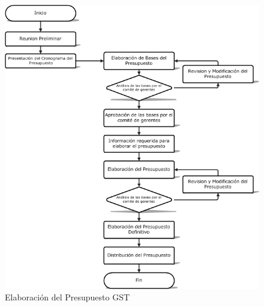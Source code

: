 \documentclass[12pt,letterpaper]{article}
\begin{document}
{\begin{section}
\begin{subsection}
\begin{center}
		\begin{figure}[htb]
		    \centering
		    \includegraphics[angle=0,width=150mm]{img/dia/Presupuesto_General_tab_b.png}
		    \caption{Elaboraci\'on del Presupuesto GST}
		    \label{luna}
		\end{figure}
  

\end{center}
\end{subsection}
\end{section}}
\end{document}

